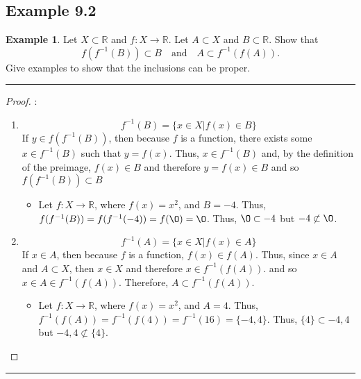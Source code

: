 \documentclass[openany, amssymb, psamsfonts]{amsart}
\newcommand{\bbR}{\mathbb{R}}
\renewcommand{\emptyset}{\O}
\newcommand{\arr}{\longrightarrow}
\theoremstyle{definition}
\newtheorem{exmp}{Example}[section]
\numberwithin{equation}{section}
\begin{document}
\subsection*{Example 9.2}
\begin{exmp} 
\label{9.2}
Let $X\subset \bbR$ and  $f\colon X\arr \bbR$. Let $A\subset X$ and $B\subset \bbR$. Show that
\[
f(f^{-1}(B))\subset B\quad\text{and}\quad A\subset f^{-1}(f(A)).
\]
Give examples to show that the inclusions can be proper.
\end{exmp}
\vspace{4pt}     \hrule   \vspace{4pt}\begin{proof}:\\
    \begin{enumerate}
        \item 
        \[f^{-1}(B) = \{x\in X | f(x) \in B\}\] If $y\in f(f^{-1}(B))$, then because $f$ is a function, there exists some $x\in f^{-1}(B)$ such that $y=f(x)$. Thus, $x\in f^{-1}(B)$ and, by the definition of the preimage, $f(x) \in B$ and therefore $y=f(x) \in B$ and so $f(f^{-1}(B))\subset B$
        \begin{itemize}
            \item Let $f\colon X \arr \bbR$, where $f(x)=x^2$, and $B = {-4}$. Thus, $f(f^{-1}(B)) = f(f^{-1}(-4)) = f(\emptyset) = \emptyset$. Thus, $\emptyset \subset {-4}$ but ${-4}\not \subset \emptyset$.
        \end{itemize}
        \item  \[f^{-1}(A) = \{x\in X | f(x) \in A\}\] If $x\in A$, then because $f$ is a function, $f(x) \in f(A)$. Thus, since $x\in A$ and $A\subset X$, then $x\in X$ and therefore $x\in f^{-1}(f(A))$. and so $x\in A \in f^{-1}(f(A))$. Therefore, $A \subset f^{-1}(f(A))$. 
        \begin{itemize}
            \item Let $f\colon X \arr \bbR$, where $f(x)=x^2$, and $A = {4}$. Thus, $f^{-1}(f(A)) = f^{-1}(f(4)) = f^{-1}(16) = \{-4,4\}$. Thus, $\{4\} \subset {-4,4}$ but ${-4,4}\not \subset \{4\}$.
        \end{itemize}
    \end{enumerate}
\end{proof} \vspace{4pt}     \hrule   \vspace{4pt}
\end{document}
